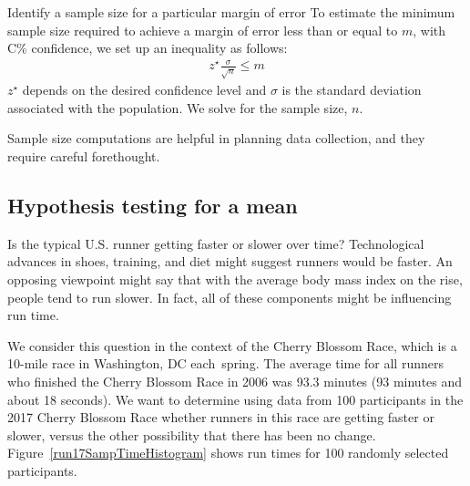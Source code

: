 \begin{onebox}{Identify a sample size for a particular margin of error}
To estimate the minimum sample size required to achieve a margin of error less than or equal to $m$, with C\% confidence, we set up an inequality as follows:  
\begin{align*}
z^{\star}\frac{\sigma}{\sqrt{n}}\leq m
\end{align*}
$z^{\star}$ depends on the desired confidence level and $\sigma$ is the standard deviation associated with the population. We solve for the sample size, $n$.
\end{onebox}

Sample size computations are helpful in planning data collection, and they require careful forethought. 



\D{\newpage}

\subsection{Hypothesis testing for a mean}
\label{oneSampleTTests}

\newcommand{\cherryblossomn}{100}
\newcommand{\cherryblossommean}{97.3}
\newcommand{\cherryblossomnull}{93.3}
\newcommand{\cherryblossomsd}{17.0}
\newcommand{\cherryblossomse}{1.7}
\newcommand{\cherryblossomt}{2.35}

Is the typical U.S. runner getting faster or slower over time? Technological advances in shoes, training, and diet might suggest runners would be faster. An opposing viewpoint might say that with the average body mass index on the rise, people tend to run slower. In fact, all of these components might be influencing run time.

We consider this question in the context of the Cherry Blossom Race, which is a 10-mile race in Washington, DC each~spring.  The average time for all runners who finished the Cherry Blossom Race in 2006 was \cherryblossomnull{} minutes (93 minutes and about 18 seconds). We want to determine using data from \cherryblossomn{} participants in the 2017 Cherry Blossom Race whether runners in this race are getting faster or slower, versus the other possibility that there has been no change.   Figure~\ref{run17SampTimeHistogram} shows run times for \cherryblossomn{} randomly selected participants.  

